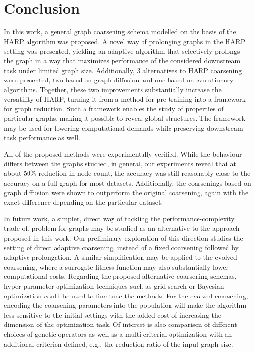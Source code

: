 \section{Conclusion}

In this work, a general graph coarsening schema modelled on the basis of the HARP algorithm was proposed. A novel way of prolonging graphs in the HARP setting was presented, yielding an adaptive algorithm that selectively prolongs the graph in a way that maximizes performance of the considered downstream task under limited graph size. Additionally, 3 alternatives to HARP coarsening were presented, two based on graph diffusion and one based on evolutionary algorithms. Together, these two improvements substantially increase the versatility of HARP, turning it from a method for pre-training into a framework for graph reduction. Such a framework enables the study of properties of particular graphs, making it possible to reveal global structures. The framework may be used for lowering computational demands while preserving downstream task performance as well.

All of the proposed methods were experimentally verified. While the behaviour differs between the graphs studied, in general, our experiments reveal that at about 50\% reduction in node count, the accuracy was still reasonably close to the accuracy on a full graph for most datasets. Additionally, the coarsenings based on graph diffusion were shown to outperform the original coarsening, again with the exact difference depending on the particular dataset.

In future work, a simpler, direct way of tackling the performance-complexity trade-off problem for graphs may be studied as an alternative to the approach proposed in this work. Our preliminary exploration of this direction \cite{prochazka_downstream_2022} studies the setting of direct adaptive coarsening, instead of a fixed coarsening followed by adaptive prolongation. A similar simplification may be applied to the evolved coarsening, where a surrogate fitness function may also substantially lower computational costs. Regarding the proposed alternative coarsening schemas, hyper-parameter optimization techniques such as grid-search or Bayesian optimization could be used to fine-tune the methods. For the evolved coarsening, encoding the coarsening parameters into the population will make the algorithm less sensitive to the initial settings with the added cost of increasing the dimension of the optimization task. Of interest is also comparison of different choices of genetic operators as well as a multi-criterial optimization with an additional criterion defined, e.g., the reduction ratio of the input graph size.
